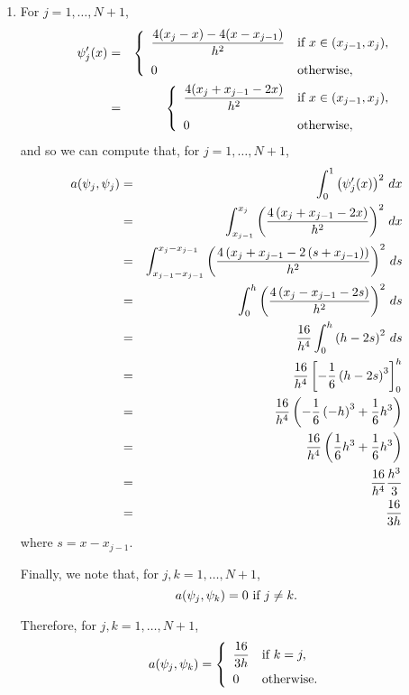 \begin{solution}
\begin{enumerate}
\begin{enumerate}
\item For $j=1,\ldots,N+1$,
\begin{eqnarray*}
\psi_j'(x)&=&\left\{\begin{array}{ll}
\displaystyle{{4(x_j-x)-4(x-x_{j-1}) \over h^2}} & \displaystyle{\mbox{if }x\in(x_{j-1},x_j)},
\\[10pt]
0 & \mbox{otherwise},
\end{array}\right.
\\
&=&\left\{\begin{array}{ll}
\displaystyle{{4(x_j+x_{j-1}-2x) \over h^2}} & \displaystyle{\mbox{if }x\in(x_{j-1},x_j)},
\\[10pt]
0 & \mbox{otherwise},
\end{array}\right.
\end{eqnarray*}
and so we can compute that, for $j=1,\ldots,N+1$,
\begin{eqnarray*}
a(\psi_j,\psi_j)&=&\int_0^1\left(\psi_j'(x)\right)^2\,dx
\\
&=&\int_{x_{j-1}}^{x_j}\left({4\left(x_j+x_{j-1}-2x\right) \over h^2}\right)^2\,dx
\\
&=&\int_{x_{j-1}-x_{j-1}}^{x_j-x_{j-1}}\left({4\left(x_j+x_{j-1}-2\left(s+x_{j-1}\right)\right) \over h^2}\right)^2\,ds
\\
&=&\int_0^h\left({4\left(x_j-x_{j-1}-2s\right) \over h^2}\right)^2\,ds
\\
&=&{16 \over h^4}\int_0^h\left(h-2s\right)^2\,ds
\\
&=&{16 \over h^4}\left[-{1 \over 6}\left(h-2s\right)^3\right]_0^h
\\
&=&{16 \over h^4}\left(-{1 \over 6}\left(-h\right)^3+{1 \over 6}h^3\right)
\\
&=&{16 \over h^4}\left({1 \over 6}h^3+{1 \over 6}h^3\right)
\\
&=&{16 \over h^4}{h^3 \over 3}
\\
&=&{16 \over 3h}
\end{eqnarray*}
where $s=x-x_{j-1}$.

Finally, we note that, for $j,k=1,\ldots,N+1$,
\[
a(\psi_j,\psi_k)=0\mbox{ if }j\ne k.
\]

Therefore, for $j,k=1,\ldots,N+1$,
\[
a(\psi_j,\psi_k)=\left\{\begin{array}{ll}\displaystyle{{16 \over 3h}} & \mbox{if }k=j, \\[.75em] \displaystyle{0} & \mbox{otherwise}.\end{array}\right.
\]


\end{enumerate}
\end{enumerate}
\end{solution}
